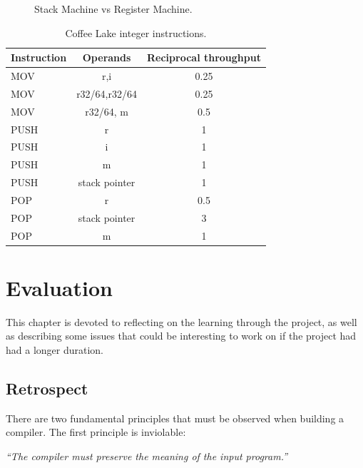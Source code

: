 
\begin{figure}[h]
    \centering
    
    \caption{Stack Machine vs Register Machine.}
    \label{fig:performance_comparison}
\end{figure}

\begin{table}[h]
    \centering
    \begin{tabular}{l|c|c}
        Instruction  & Operands &  Reciprocal throughput \\ \hline
        MOV & r,i & 0.25 \\\hline
        MOV & r32/64,r32/64 & 0.25\\ \hline
        MOV & r32/64, m & 0.5 \\\hline
        PUSH & r & 1 \\\hline
        PUSH & i & 1 \\\hline
        PUSH & m & 1 \\\hline
        PUSH & stack pointer & 1 \\\hline
        POP & r & 0.5 \\\hline
        POP & stack pointer & 3 \\\hline
        POP & m & 1
    \end{tabular}
    \caption{Coffee Lake integer instructions.}
    \label{tab:instruction_table}
\end{table}

\chapter{Evaluation}
This chapter is devoted to reflecting on the learning through the project, as well as describing some issues that could be interesting to work on if the project had had a longer duration.

\section{Retrospect}
There are two fundamental principles that must be observed when building a compiler. The first principle is inviolable:

\begin{displayquote}
    \textit{``The compiler must preserve the meaning of the input program.''}
\end{displayquote}
\hspace*{}

